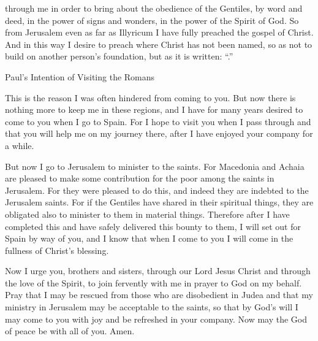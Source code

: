 {through
me
in order to bring about the obedience
of the Gentiles,
by word
and
deed,
in
the power
of signs
and
wonders,
in
the power
of the Spirit
of God. So
from
Jerusalem
even
as far as
Illyricum
I have fully preached
the gospel
of Christ.
And
in this way
I desire
to preach
where
Christ
has
not
been named,
so
as not
to build
on
another person’s
foundation,
but
as
it is written: “{}.”
\par }{\SH Paul’s Intention of Visiting the Romans
\par }{\PP {}This is the reason
I was
often
hindered
from coming
to
you.
But
now
there is nothing
more to keep me in
these
regions,
and
I have
for
many
years
desired
to come
to
you
when
I go
to
Spain.
For
I hope
to visit
you
when
I pass through
and
that you
will help
me on
my journey
there,
after I have enjoyed
your company for a while.
\par }{\PP {}But
now
I go
to
Jerusalem
to minister
to the saints.
For
Macedonia
and
Achaia
are pleased
to make
some
contribution
for
the poor
among the saints
in
Jerusalem.
For
they were pleased
to do this, and
indeed they are
indebted
to the Jerusalem saints.
For
if
the Gentiles
have shared
in their
spiritual things,
they are obligated
also
to minister
to them
in
material things.
Therefore
after
I have completed
this
and
have safely delivered
this
bounty
to them,
I will set out
for
Spain
by way
of you,
and
I know
that
when
I come
to
you
I will come
in
the fullness
of Christ’s
blessing.
\par }{\PP {}Now I urge
you,
brothers and sisters,
through
our
Lord
Jesus
Christ
and
through
the love
of the Spirit,
to join fervently
with me
in
prayer
to
God
on
my behalf.
Pray
that I may be rescued
from
those who are disobedient
in
Judea
and
that my
ministry
in
Jerusalem
may be
acceptable
to the saints,
so that
by
God’s
will
I may come
to
you
with
joy
and be refreshed
in your company.
Now
may the God
of peace
be with
all
of you.
Amen.

}
